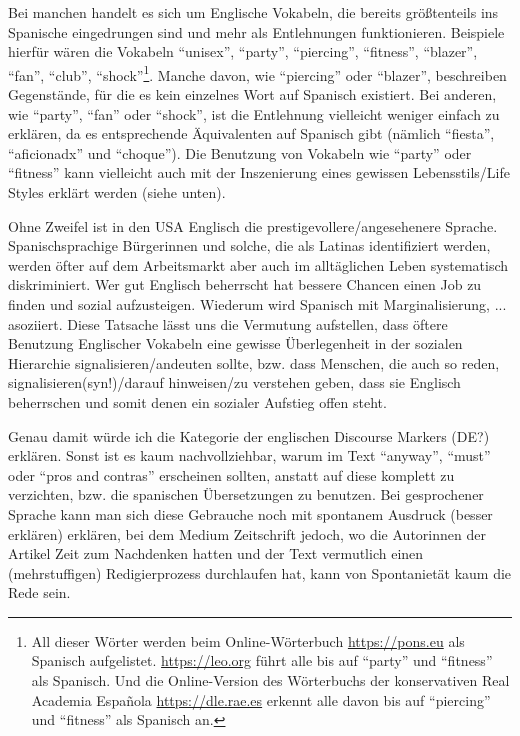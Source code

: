 Bei manchen handelt es sich um Englische Vokabeln, die bereits größtenteils ins Spanische eingedrungen sind und mehr als Entlehnungen funktionieren.
Beispiele hierfür wären die Vokabeln ``unisex'', ``party'', ``piercing'', ``fitness'', ``blazer'', ``fan'', ``club'', ``shock''\footnote{All dieser Wörter werden beim Online-Wörterbuch \url{https://pons.eu} als Spanisch aufgelistet. \url{https://leo.org} führt alle bis auf ``party'' und ``fitness'' als Spanisch. Und die Online-Version des Wörterbuchs der konservativen Real Academia Española \url{https://dle.rae.es} erkennt alle davon bis auf ``piercing'' und ``fitness'' als Spanisch an.}.
Manche davon, wie ``piercing'' oder ``blazer'', beschreiben Gegenstände, für die es kein einzelnes Wort auf Spanisch existiert.
Bei anderen, wie ``party'', ``fan'' oder ``shock'',  ist die Entlehnung vielleicht weniger einfach zu erklären, da es entsprechende Äquivalenten auf Spanisch gibt (nämlich ``fiesta'', ``aficionadx'' und ``choque''). %
Die Benutzung von Vokabeln wie ``party'' oder ``fitness'' kann vielleicht auch mit der Inszenierung eines gewissen Lebensstils/Life Styles erklärt werden (siehe unten).

Ohne Zweifel ist in den USA Englisch die prestigevollere/angesehenere Sprache.
Spanischsprachige Bürgerinnen und solche, die als Latinas identifiziert werden, werden öfter auf dem Arbeitsmarkt aber auch im alltäglichen Leben systematisch diskriminiert.
Wer gut Englisch beherrscht hat bessere Chancen einen Job zu finden und sozial aufzusteigen.
Wiederum wird Spanisch mit Marginalisierung, ... asoziiert. %
Diese Tatsache lässt uns die Vermutung aufstellen, dass öftere Benutzung Englischer Vokabeln eine gewisse Überlegenheit in der sozialen Hierarchie signalisieren/andeuten sollte, bzw. dass Menschen, die auch so reden, signalisieren(syn!)/darauf hinweisen/zu verstehen geben, dass sie Englisch beherrschen und somit denen ein sozialer Aufstieg offen steht.

Genau damit würde ich die Kategorie der englischen Discourse Markers (DE?) erklären.
Sonst ist es kaum nachvollziehbar, warum im Text ``anyway'', ``must'' oder ``pros and contras'' erscheinen sollten, anstatt auf diese komplett zu verzichten, bzw. die spanischen Übersetzungen zu benutzen.
Bei gesprochener Sprache kann man sich diese Gebrauche noch mit spontanem Ausdruck (besser erklären) erklären, bei dem Medium Zeitschrift jedoch, wo die Autorinnen der Artikel Zeit zum Nachdenken hatten und der Text vermutlich einen (mehrstuffigen) Redigierprozess durchlaufen hat, kann von Spontanietät kaum die Rede sein.

